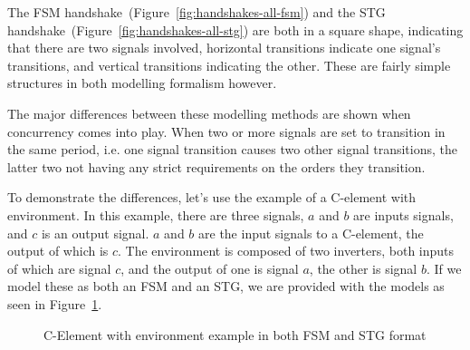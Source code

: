 The FSM handshake~(Figure~\ref{fig:handshakes-all-fsm}) and the STG handshake~(Figure~\ref{fig:handshakes-all-stg}) are both in a 
square shape, indicating that there are two signals involved, horizontal transitions indicate one signal's transitions, and vertical transitions 
indicating the other. These are fairly simple structures in both modelling formalism however. 

The major differences between these modelling methods are shown when concurrency comes into play. When two or more signals are
set to transition in the same period, i.e. one signal transition causes two other signal transitions, the latter two not having any
strict requirements on the orders they transition. 

To demonstrate the differences, let's use the example of a C-element with environment. In this example, there are three signals, 
$a$ and $b$ are inputs signals, and $c$ is an output signal. $a$ and $b$ are the input signals to a C-element, the output of which is $c$. 
The environment is composed of two inverters, both inputs of which are signal $c$, and the output of one is signal $a$, the other is signal $b$. 
If we model these as both an FSM and an STG, we are provided with the models as seen in Figure~\ref{fig:c-element-env}.

\begin{figure}[H]
  \caption{\label{fig:c-element-env} C-Element with environment example in both FSM and STG format}
\end{figure}

